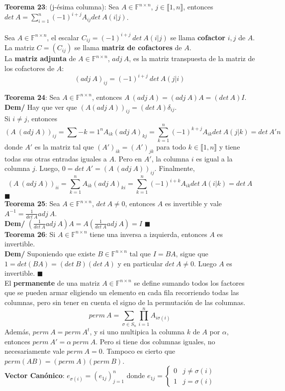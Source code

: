 \documentclass[11pt,a4paper]{article}
\newcommand*{\QEDA}{\null\nobreak\hfill\ensuremath{\blacksquare}}
\begin{document}
\textbf{Teorema 23}: (j-\'esima columna): Sea $A \in \mathbb{F}^{n \times n}$, $j \in \llbracket 1,n \rrbracket$, entonces 
$\displaystyle{det\ A = \sum_{i=1}^n (-1)^{i+j} A_{ij} det\ A(i|j)}$. \\ \\

Sea $A \in \mathbb{F}^{n \times n}$, el escalar $C_{ij} = (-1)^{i+j}\ det\ A(i|j)$ se llama \textbf{cofactor} $i,j$ de $A$.\\
La matriz $C = (C_{ij})$ se llama \textbf{matriz de cofactores} de $A$.\\
La \textbf{matriz adjunta} de $A \in \mathbb{F}^{n \times n}$, $adj\ A$, es la matriz transpuesta de la matriz de los cofactores de $A$:
$$(adj\ A)_{ij} = (-1)^{i+j}\ det\ A(j|i)$$

\textbf{Teorema 24}: Sea $A \in \mathbb{F}^{n \times n}$, entonces $A\ (adj\ A) = (adj\ A) A = (det\ A)I$.\\
\textbf{Dem/} Hay que ver que $(A (adj\ A))_{ij} = (det\ A) \delta_{ij}$.\\
Si $i \not = j$, entonces 
$$(A\ (adj\ A))_{ij} = \sum-{k=1}^n A_{ik}(adj\ A)_{kj} = \sum_{k=1}^n (-1)^{k+j} A_{ik} det\ A(j|k) = det\ A'n$$
donde $A'$ es la matriz tal que $(A')_{ik} = (A')_{jk}$ para todo $k \in \llbracket 1,n \rrbracket$ y tiene todas sus otras entradas iguales a $A$. Pero en $A'$, la columna $i$ es igual a la columna $j$. Luego, $0 = det\ A' = (A\ (adj\ A))_{ij}$. Finalmente, $$(A\ (adj\ A))_{ii} = \sum_{k=1}^n A_{ik}(adj\ A)_{ki} = \sum_{k=1}^n (-1)^{i+k} A_{ik} det\ A(i|k) = det\ A$$
\QEDA\\

\textbf{Teorema 25}: Sea $A \in \mathbb{F}^{n \times n}$, $det\ A \not = 0$, entonces $A$ es invertible y vale $A^{-1} = \frac{1}{det\ A} adj\ A$.\\
\textbf{Dem/} $(\frac{1}{det\ A} adj\ A) A = A (\frac{1}{det\ A} adj\ A) = I$ \QEDA\\

\textbf{Teorema 26}: Si $A \in \mathbb{F}^{n \times n}$ tiene una inversa a izquierda, entonces $A$ es invertible.\\
\textbf{Dem/} Suponiendo que existe $B \in \mathbb{F}^{n \times n}$ tal que $I = BA$, sigue que $1 = det (BA) = (det\ B)(det\ A)$ y en particular $det\ A \not = 0$. Luego $A$ es invertible. \QEDA\\

El \textbf{permanente} de una matriz $A \in \mathbb{F}^{n \times n}$ se define sumando todos los factores que se pueden armar eligiendo un elemento en cada fila recorriendo todas las columnas, pero sin tener en cuenta el signo de la permutaci\'on de las columnas. $$perm\ A = \sum_{\sigma \in S_n} \prod_{i=1}^n A_{i\sigma(i)}$$ Adem\'as, $perm\ A = perm\ A^t$, y si uno multipica la columna $k$ de $A$ por $\alpha$, entonces $perm\ A' = \alpha\ perm\ A$. Pero si tiene dos columnas iguales, no necesariamente vale $perm\ A = 0$. Tampoco es cierto que $perm(AB) = (perm\ A)(perm\ B)$.\\

\textbf{Vector Can\'onico}: $e_{\sigma(i)} = (e_{1j})^n_{j=1}$ donde $e_{1j} = \begin{cases} 0 & j \not = \sigma(i) \\ 1 & j = \sigma(i) \end{cases}$
\end{document}
